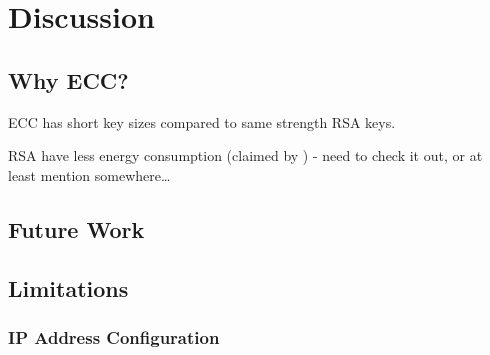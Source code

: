 \chapter{Discussion}
\label{chapter_discussion}
\acresetall


\section{Why ECC?}
ECC has short key sizes compared to same strength RSA keys.

RSA have less energy consumption (claimed by \cite{hosseinisecure}) - need to
check it out, or at least mention somewhere\ldots

\section{Future Work}

\section{Limitations}

\subsection{IP Address Configuration}\label{ip_address_conf}